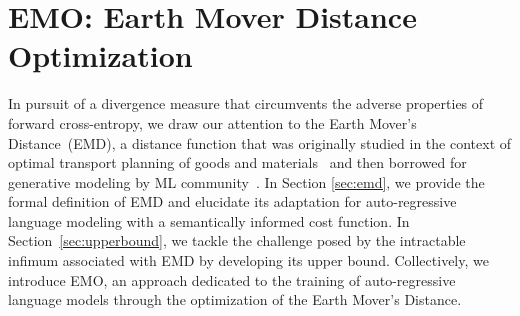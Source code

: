 \section{EMO: Earth Mover Distance Optimization}
In pursuit of a divergence measure that circumvents the adverse properties of forward cross-entropy, we draw our attention to the 
Earth Mover's Distance~(EMD), a distance function that was originally studied in the context of optimal transport planning of goods and materials~\citep{kantorovich1960mathematical,villani2021topics} and then borrowed for generative modeling by ML community~\citep{wgan,wae}. In Section \ref{sec:emd}, we provide the formal definition of EMD and elucidate its adaptation for auto-regressive language modeling with a semantically informed cost function. In Section~\ref{sec:upperbound}, we tackle the challenge posed by the intractable infimum associated with EMD by developing its upper bound. Collectively, we introduce EMO, an approach dedicated to the training of auto-regressive language models through the optimization of the Earth Mover's Distance.


